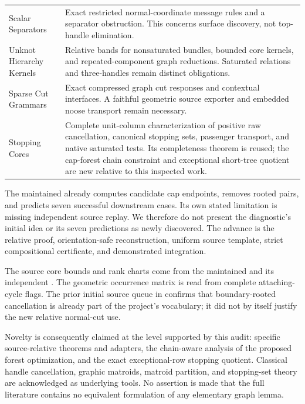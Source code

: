 \begin{longtable}{@{}p{}p{}@{}}
Scalar Separators
& Exact restricted normal-coordinate message rules and a separator
obstruction. This concerns surface discovery, not top-handle elimination.\\[4pt]
Unknot Hierarchy Kernels
& Relative bands for nonsaturated bundles, bounded core kernels, and
repeated-component graph reductions. Saturated relations and three-handles
remain distinct obligations.\\[4pt]
Sparse Cut Grammars
& Exact compressed graph cut responses and contextual interfaces. A faithful
geometric source exporter and embedded noose transport remain necessary.\\[4pt]
Stopping Cores
& Complete unit-column characterization of positive raw cancellation,
canonical stopping sets, passenger transport, and native saturated tests.
Its completeness theorem is reused; the cap-forest chain constraint and
exceptional short-tree quotient are new relative to this inspected work.\\
\end{longtable}

The maintained  already
computes candidate cap endpoints, removes rooted pairs, and predicts seven
successful downstream cases. Its own stated limitation is missing
independent source replay. We therefore do not present the diagnostic's
initial idea or its seven predictions as newly discovered. The advance is
the relative proof, orientation-safe reconstruction, uniform source
template, strict compositional certificate, and demonstrated integration.

The source core bounds and rank charts come from the maintained
 and its independent
. The geometric occurrence
matrix is read from complete attaching-cycle flags. The prior initial
source queue in  confirms that
boundary-rooted cancellation is already part of the project's vocabulary;
it did not by itself justify the new relative normal-cut use.

Novelty is consequently claimed at the level supported by this audit:
specific source-relative theorems and adapters, the chain-aware analysis of
the proposed forest optimization, and the exact exceptional-row stopping
quotient. Classical handle cancellation, graphic matroids, matroid
partition, and stopping-set theory are acknowledged as underlying tools.
No assertion is made that the full literature contains no equivalent
formulation of any elementary graph lemma.
